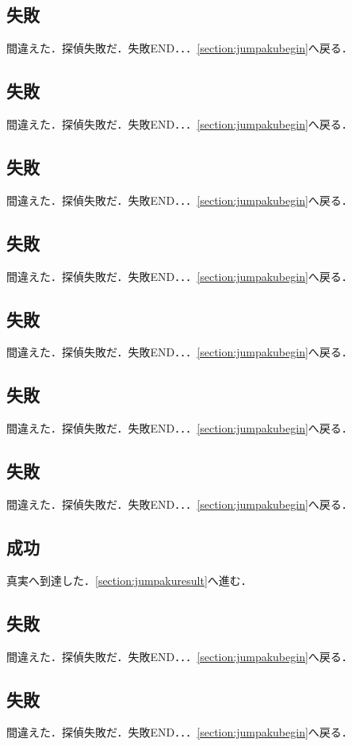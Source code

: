 \subsection{失敗}\label{section:jumpakufailure16}間違えた．探偵失敗だ．失敗END．．．\ref{section:jumpakubegin}へ戻る．\newpage
\subsection{失敗}\label{section:jumpakufailure17}間違えた．探偵失敗だ．失敗END．．．\ref{section:jumpakubegin}へ戻る．\newpage
\subsection{失敗}\label{section:jumpakufailure18}間違えた．探偵失敗だ．失敗END．．．\ref{section:jumpakubegin}へ戻る．\newpage
\subsection{失敗}\label{section:jumpakufailure19}間違えた．探偵失敗だ．失敗END．．．\ref{section:jumpakubegin}へ戻る．\newpage
\subsection{失敗}\label{section:jumpakufailure20}間違えた．探偵失敗だ．失敗END．．．\ref{section:jumpakubegin}へ戻る．\newpage
\subsection{失敗}\label{section:jumpakufailure21}間違えた．探偵失敗だ．失敗END．．．\ref{section:jumpakubegin}へ戻る．\newpage
\subsection{失敗}\label{section:jumpakufailure22}間違えた．探偵失敗だ．失敗END．．．\ref{section:jumpakubegin}へ戻る．\newpage
\subsection{成功}\label{section:jumpakusuccess23}真実へ到達した．\ref{section:jumpakuresult}へ進む．\newpage
\subsection{失敗}\label{section:jumpakufailure24}間違えた．探偵失敗だ．失敗END．．．\ref{section:jumpakubegin}へ戻る．\newpage
\subsection{失敗}\label{section:jumpakufailure25}間違えた．探偵失敗だ．失敗END．．．\ref{section:jumpakubegin}へ戻る．\newpage

